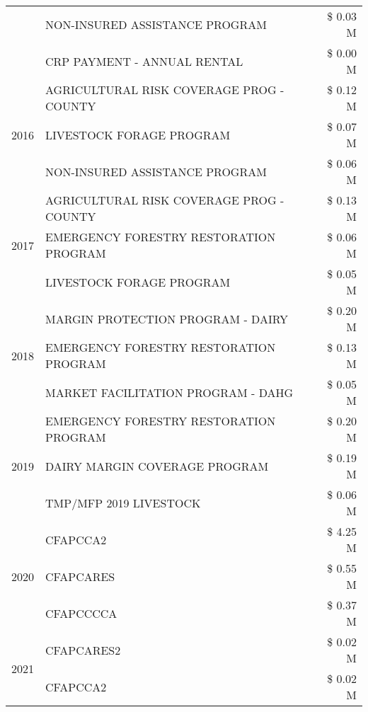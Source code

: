 \begin{tabular}{llr}
 & NON-INSURED ASSISTANCE PROGRAM & \$ 0.03 M \\
 & CRP PAYMENT - ANNUAL RENTAL & \$ 0.00 M \\
\cline{1-3}
\multirow[t]{3}{*}{2016} & AGRICULTURAL RISK COVERAGE PROG - COUNTY & \$ 0.12 M \\
 & LIVESTOCK FORAGE PROGRAM & \$ 0.07 M \\
 & NON-INSURED ASSISTANCE PROGRAM & \$ 0.06 M \\
\cline{1-3}
\multirow[t]{3}{*}{2017} & AGRICULTURAL RISK COVERAGE PROG - COUNTY & \$ 0.13 M \\
 & EMERGENCY FORESTRY RESTORATION PROGRAM & \$ 0.06 M \\
 & LIVESTOCK FORAGE PROGRAM & \$ 0.05 M \\
\cline{1-3}
\multirow[t]{3}{*}{2018} & MARGIN PROTECTION PROGRAM - DAIRY & \$ 0.20 M \\
 & EMERGENCY FORESTRY RESTORATION PROGRAM & \$ 0.13 M \\
 & MARKET FACILITATION PROGRAM - DAHG & \$ 0.05 M \\
\cline{1-3}
\multirow[t]{3}{*}{2019} & EMERGENCY FORESTRY RESTORATION PROGRAM & \$ 0.20 M \\
 & DAIRY MARGIN COVERAGE PROGRAM & \$ 0.19 M \\
 & TMP/MFP 2019 LIVESTOCK & \$ 0.06 M \\
\cline{1-3}
\multirow[t]{3}{*}{2020} & CFAPCCA2 & \$ 4.25 M \\
 & CFAPCARES & \$ 0.55 M \\
 & CFAPCCCCA & \$ 0.37 M \\
\cline{1-3}
\multirow[t]{2}{*}{2021} & CFAPCARES2 & \$ 0.02 M \\
 & CFAPCCA2 & \$ 0.02 M \\
\cline{1-3}
\bottomrule
\end{tabular}

